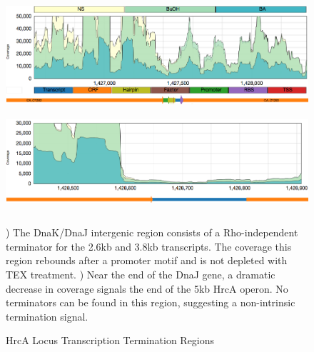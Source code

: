 \begin{figure}
\small
{\includegraphics[width=\textwidth,height=1.5in]{images/Assembly/Examples/HrcA/DnaKJ-IGR.png}
\label{fig:5.17a}}
{\includegraphics[width=\textwidth,height=1.5in]{images/Assembly/Examples/HrcA/HrcA-termination.png}
\label{fig:5.17b}}
\caption{HrcA Locus Transcription Termination Regions}
) The DnaK/DnaJ intergenic region consists of a Rho-independent terminator for the 2.6kb and 3.8kb transcripts. The coverage this region rebounds after a promoter motif and is not depleted with TEX treatment. ) Near the end of the DnaJ gene, a dramatic decrease in coverage signals the end of the 5kb HrcA operon. No terminators can be found in this region, suggesting a non-intrinsic termination signal.
\end{figure}



